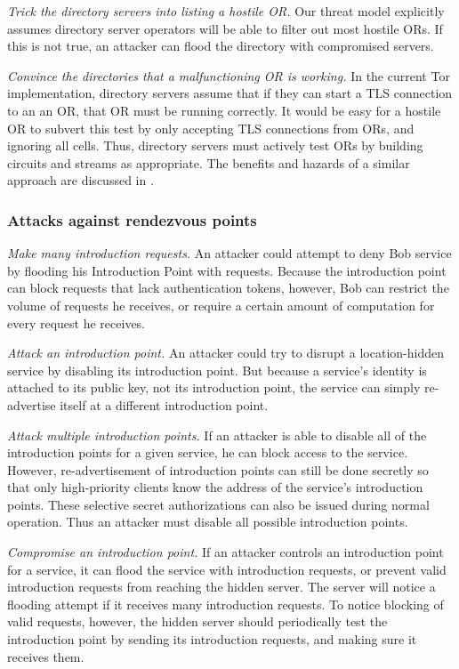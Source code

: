 \documentclass[times,10pt,twocolumn]{article}
\begin{document}
\emph{Trick the directory servers into listing a hostile OR.}
Our threat model explicitly assumes directory server operators will
be able to filter out most hostile ORs.  If this is not true, an
attacker can flood the directory with compromised servers.

\emph{Convince the directories that a malfunctioning OR is
working.}  In the current Tor implementation, directory servers
assume that if they can start a TLS connection to an an OR, that OR
must be running correctly.  It would be easy for a hostile OR to
subvert this test by only accepting TLS connections from ORs, and
ignoring all cells. Thus, directory servers must actively test ORs
by building circuits and streams as appropriate.  The benefits and
hazards of a similar approach are discussed in \cite{mix-acc}.
  
\subsubsection*{Attacks against rendezvous points}

\emph{Make many introduction requests.}  An attacker could
attempt to deny Bob service by flooding his Introduction Point with
requests.  Because the introduction point can block requests that
lack authentication tokens, however, Bob can restrict the volume of
requests he receives, or require a certain amount of computation for
every request he receives.
  
\emph{Attack an introduction point.} An attacker could try to
disrupt a location-hidden service by disabling its introduction
point.  But because a service's identity is attached to its public
key, not its introduction point, the service can simply re-advertise
itself at a different introduction point.

\emph{Attack multiple introduction points.}  If an attacker is
able to disable all of the introduction points for a given service,
he can block access to the service. However, re-advertisement of
introduction points can still be done secretly so that only
high-priority clients know the address of the service's introduction
points. These selective secret authorizations can also be issued
during normal operation. Thus an attacker must disable
all possible introduction points.

\emph{Compromise an introduction point.} If an attacker controls
an introduction point for a service, it can flood the service with
introduction requests, or prevent valid introduction requests from
reaching the hidden server.  The server will notice a flooding
attempt if it receives many introduction requests.  To notice
blocking of valid requests, however, the hidden server should
periodically test the introduction point by sending its introduction
requests, and making sure it receives them.
\end{document}
